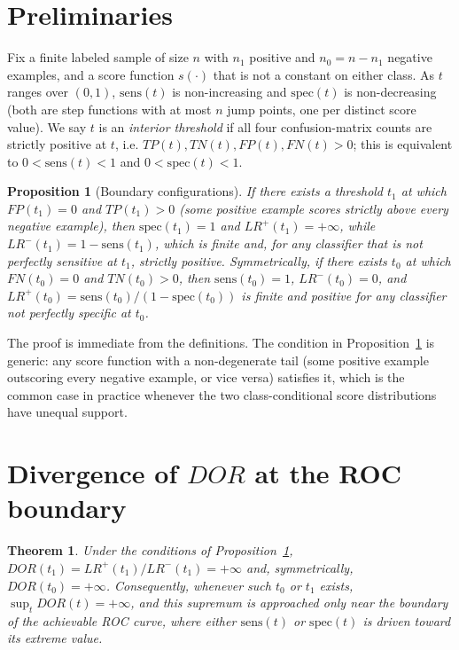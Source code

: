 \documentclass[11pt]{article}
\newtheorem{theorem}{Theorem}
\newtheorem{proposition}{Proposition}
\begin{document}
\section{Preliminaries}

Fix a finite labeled sample of size $n$ with $n_1$ positive and $n_0 =
n - n_1$ negative examples, and a score function $s(\cdot)$ that is not a
constant on either class. As $t$ ranges over $(0,1)$, $\mathrm{sens}(t)$ is
non-increasing and $\mathrm{spec}(t)$ is non-decreasing (both are step
functions with at most $n$ jump points, one per distinct score value). We
say $t$ is an \emph{interior threshold} if all four confusion-matrix counts
are strictly positive at $t$, i.e. $TP(t), TN(t), FP(t), FN(t) > 0$; this is
equivalent to $0 < \mathrm{sens}(t) < 1$ and $0 < \mathrm{spec}(t) < 1$.

\begin{proposition}[Boundary configurations]
\label{prop:boundary}
If there exists a threshold $t_1$ at which $FP(t_1) = 0$ and $TP(t_1) > 0$
(some positive example scores strictly above every negative example), then
$\mathrm{spec}(t_1) = 1$ and $LR^+(t_1) = +\infty$, while
$LR^-(t_1) = 1 - \mathrm{sens}(t_1)$, which is finite and, for any
classifier that is not perfectly sensitive at $t_1$, strictly positive.
Symmetrically, if there exists $t_0$ at which $FN(t_0) = 0$ and
$TN(t_0) > 0$, then $\mathrm{sens}(t_0) = 1$, $LR^-(t_0) = 0$, and
$LR^+(t_0) = \mathrm{sens}(t_0)/(1-\mathrm{spec}(t_0))$ is finite and
positive for any classifier not perfectly specific at $t_0$.
\end{proposition}

The proof is immediate from the definitions. The condition in
Proposition~\ref{prop:boundary} is generic: any score function with a
non-degenerate tail (some positive example outscoring every negative
example, or vice versa) satisfies it, which is the common case in practice
whenever the two class-conditional score distributions have unequal support.

\section{Divergence of $DOR$ at the ROC boundary}

\begin{theorem}
\label{thm:divergence}
Under the conditions of Proposition~\ref{prop:boundary},
$DOR(t_1) = LR^+(t_1)/LR^-(t_1) = +\infty$ and, symmetrically,
$DOR(t_0) = +\infty$. Consequently, whenever such $t_0$ or $t_1$ exists,
$\sup_t DOR(t) = +\infty$, and this supremum is approached only near the
boundary of the achievable ROC curve, where either $\mathrm{sens}(t)$ or
$\mathrm{spec}(t)$ is driven toward its extreme value.
\end{theorem}
\end{document}

